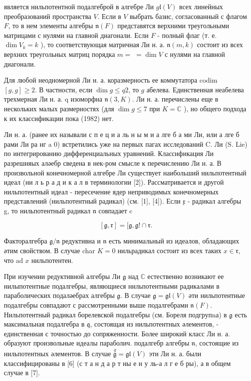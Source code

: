 \documentclass[10pt]{article}
\begin{document}
является нильпотентной подалгеброй в алгебре Ли $g \mathfrak{l}(V)$ всех линейных преобразований пространства $V$. Если в $V$ выбрать базис, согласованный с флагом $F$, то в нем элементы алгебры $\mathfrak{n}(F)$ представятся верхними треугольными матрицами с нулями на главной диагонали. Если $F$ - полный флаг (т. е. $\operatorname{dim} V_{k}=k$ ), то соответствующая матричная Ли н. а. $\mathfrak{n}(m, k)$ состоит из всех верхних треугольных матриц порядка $m=$ $=\operatorname{dim} V$ с нулями на главной диагонали.



Для любой неодномерной Ли н. а. коразмерность ее коммутатора codim $[g, g] \geqslant 2$. В частности, если $\operatorname{dim} g \leqslant q 2$, то $g$ абелева. Единственная неабелева трехмерная Ли н. а. q изоморфна $\mathfrak{n}(3, K)$. Ли н. а. перечислены еще в нескольких малых размерностях (для $\operatorname{dim} g \leqslant 7$ при $K=\mathbb{C}$ ), но общего подхода к их классификации пока (1982) нет.



Ли н. а. (ранее их называли с п е ц и а ль н ы м и а лге б а ми Ли, или а лге б рами Ли ра нг a 0) встретились уже на первых пагах исследований C. Ли (S. Lie) по интегрированию дифференциальных уравнений. Классификация Ли разрешияых аләебр сведена в нек-ром смысле к перечислению Ли н. а. В произвольной конечномерной алгебре Ли существует наибольший нильпотентный идеал (ни л ь р а д и к а л в терминологии [2]). Рассматривается и другой нильпотентный идеал - пересечение ядер неприводимых конечномерных представлений (нильпотентный радикал) (см. [1], [4]). Если $\mathfrak{x}$ - радикал алгебры g, то нильпотентный радикал $\mathfrak{n}$ совпадает c



\[

[\mathfrak{g}, \mathfrak{r}]=[\mathfrak{g}, \mathfrak{g} ! \cap \mathfrak{r} .

\]



Факторалгебра $\mathfrak{g} / \mathfrak{n}$ редуктивна и $\mathfrak{n}$ есть минимальный из идеалов, обладающих әтим свойством. В случае char $K=0$ нильрадикал состоит из всех таких $x \in \mathfrak{r}$, что ad $x$ нильпотентен.



При изучении редуктивной алгебры Ли $\mathfrak{g}$ над $\mathbb{C}$ естественно возникают ее нилыпотентные подалгебры, являющиеся нильпотентными радикалами в параболических подаләебрах алгебры $\mathfrak{g}$. В случае $\mathfrak{g}=\mathfrak{g l}(V)$ әти нильпотентные подалгебры совпадают с рассмотренными выше подалгебрами $\mathfrak{n}(F)$. Нильпотентный радикал борелевской подалгебры (см. Бореля подгрупnа) в $\mathfrak{g}$ есть максимальная подалгебра в $\mathfrak{q}$, состоящая из нильпотентных әлементов, - единственная с точностью до сопряженности. Более широкий класс Ли н. а. образуют произвольные идеалы параболич. подалгебр алгебры $\mathfrak{n}$, состоящие из нильпотентных әлементов. В случае $\stackrel{g}{\mathfrak{g}}=\mathfrak{g l}(V)$ эти Ли н. а. были классифицированы в [6] (с т а н д а р т ны е н у ль-а л г е б ры), а в общем случае в [7].
\end{document}
